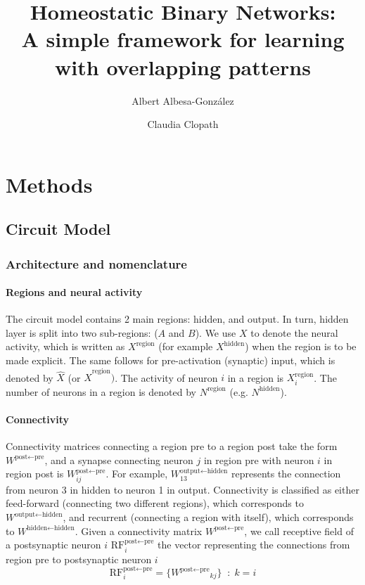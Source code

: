 \documentclass{article}
\title{Homeostatic Binary Networks: \\ A simple framework for learning with overlapping patterns}
\author[1]{Albert Albesa-González}
\author[1]{Claudia Clopath}
\affil[1]{Department of Bioengineering, Imperial College London, London, UK}
\begin{document}
\section*{Methods}\label{methods}
\subsection*{Circuit Model}
\subsubsection*{Architecture and nomenclature}
\paragraph*{Regions and neural activity}
The circuit model contains 2 main regions: hidden, and output. In turn, hidden layer is split into two sub-regions: ($A$ and $B$). We use $X$ to denote the neural activity, which is written as $X^\textrm{region}$ (for example $X^\textrm{hidden}$) when the region is to be made explicit. The same follows for pre-activation (synaptic) input, which is denoted by $\hat{X}$ (or $\hat{X}^\textrm{region})$. The activity of neuron $i$ in a region is $X^\textrm{region}_i$. The number of neurons in a region is denoted by $N^\textrm{region}$ (e.g. $N^\textrm{hidden}$).
\paragraph{Connectivity}
Connectivity matrices connecting a region \textrm{pre} to a region \textrm{post} take the form $W^{\textrm{post}\leftarrow\textrm{pre}}$, and a synapse connecting neuron $j$ in region pre with neuron $i$ in region post is $W^{\textrm{post}\leftarrow\textrm{pre}}_{ij}$. For example, $W^{\textrm{output}\leftarrow\textrm{hidden}}_{13}$ represents the connection from neuron 3 in hidden to neuron 1 in output. Connectivity is classified as either feed-forward (connecting two different regions), which corresponds to  $W^{\textrm{output}\leftarrow\textrm{hidden}}$, and recurrent (connecting a region with itself), which corresponds to $W^{\textrm{hidden}\leftarrow\textrm{hidden}}$. Given a connectivity matrix $W^{\textrm{post}\leftarrow\textrm{pre}}$, we call receptive field of a postsynaptic neuron $i$ $\textrm{RF}^{\textrm{post}\leftarrow\textrm{pre}}_i$ the vector representing the connections from region pre to postsynaptic neuron $i$
\begin{equation}
    \textrm{RF}^{\textrm{post}\leftarrow\textrm{pre}}_i = \{{W^{\textrm{post}\leftarrow\textrm{pre}}}_{kj}\} \;\; : \;k = i 
\end{equation}
\end{document}
